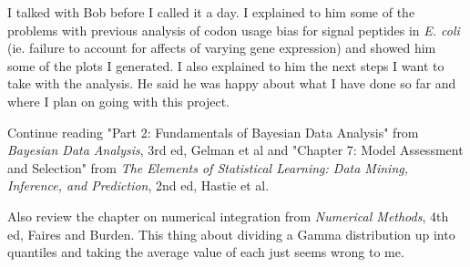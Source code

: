\documentclass[11pt]{labbook}
\begin{document}
I talked with Bob before I called it a day. I explained to him some of the problems with previous analysis of codon usage bias for signal peptides in \textit{E. coli} (ie. failure to account for affects of varying gene expression) and showed him some of the plots I generated. I also explained to him the next steps I want to take with the analysis. He said he was happy about what I have done so far and where I plan on going with this project.

Continue reading "Part 2: Fundamentals of Bayesian Data Analysis" from \textit{Bayesian Data Analysis}, 3rd ed, Gelman et al and "Chapter 7: Model Assessment and Selection" from \textit{The Elements of Statistical Learning: Data Mining, Inference, and Prediction}, 2nd ed, Hastie et al.

Also review the chapter on numerical integration from \textit{Numerical Methods}, 4th ed, Faires and Burden. This thing about dividing a Gamma distribution up into quantiles and taking the average value of each just seems wrong to me. 
\end{document}
